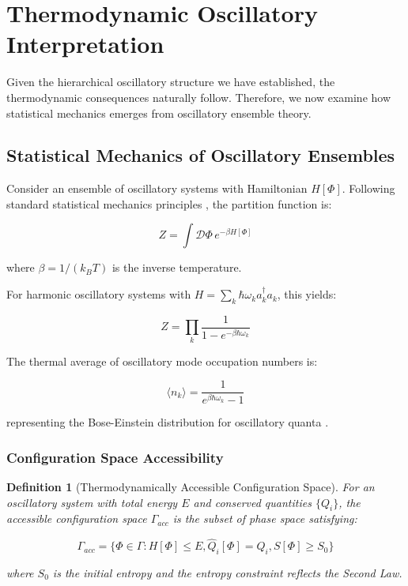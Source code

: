 \documentclass[11pt]{article}
\newtheorem{definition}[theorem]{Definition}
\theoremstyle{remark}
\begin{document}
\section{Thermodynamic Oscillatory Interpretation}

Given the hierarchical oscillatory structure we have established, the thermodynamic consequences naturally follow. Therefore, we now examine how statistical mechanics emerges from oscillatory ensemble theory.

\subsection{Statistical Mechanics of Oscillatory Ensembles}

Consider an ensemble of oscillatory systems with Hamiltonian $H[\Phi]$. Following standard statistical mechanics principles \cite{pathria2011statistical}, the partition function is:

$$Z = \int \mathcal{D}\Phi \, e^{-\beta H[\Phi]}$$

where $\beta = 1/(k_B T)$ is the inverse temperature.

For harmonic oscillatory systems with $H = \sum_k \hbar\omega_k a_k^\dagger a_k$, this yields:

$$Z = \prod_k \frac{1}{1 - e^{-\beta\hbar\omega_k}}$$

The thermal average of oscillatory mode occupation numbers is:

$$\langle n_k\rangle = \frac{1}{e^{\beta\hbar\omega_k} - 1}$$

representing the Bose-Einstein distribution for oscillatory quanta \cite{pathria2011statistical}.

\subsubsection{Configuration Space Accessibility}

\begin{definition}[Thermodynamically Accessible Configuration Space]
For an oscillatory system with total energy $E$ and conserved quantities $\{Q_i\}$, the accessible configuration space $\Gamma_{acc}$ is the subset of phase space satisfying:

$$\Gamma_{acc} = \{\Phi \in \Gamma : H[\Phi] \leq E, \hat{Q}_i[\Phi] = Q_i, S[\Phi] \geq S_0\}$$

where $S_0$ is the initial entropy and the entropy constraint reflects the Second Law.
\end{definition}
\end{document}
